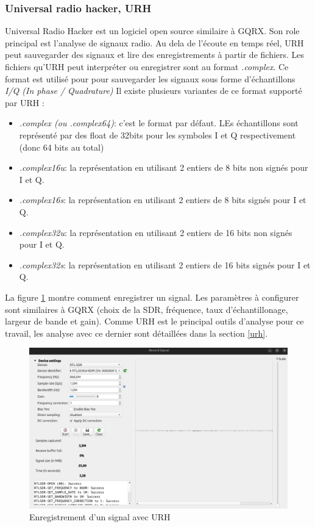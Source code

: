 \subsubsection{Universal radio hacker, URH}

Universal Radio Hacker est un logiciel open source similaire à GQRX. Son role principal est l'analyse de signaux radio. Au dela de l'écoute en temps réel, URH peut sauvegarder des signaux et lire des enregistrements à partir de fichiers. Les fichiers qu'URH peut interpréter ou enregistrer sont au format \textit{.complex}.  Ce format est utilisé pour pour sauvegarder les signaux sous forme d'échantillons \textit{I/Q (In phase / Quadrature)} Il existe plusieurs variantes de ce format supporté par URH :

\begin{itemize}
\item \textit{.complex (ou .complex64)}: c'est le format par défaut. LEs échantillons sont représenté par des float de 32bits pour les symboles I et Q respectivement (donc 64 bits au total)
 
\item  \textit{.complex16u}: la représentation en utilisant 2  entiers de 8 bits non signés pour I et Q.

\item  \textit{.complex16s}: la représentation en utilisant 2  entiers de 8 bits signés pour I et Q.

\item  \textit{.complex32u}: la représentation en utilisant 2  entiers de 16 bits non signés pour I et Q. 

\item  \textit{.complex32s}: la représentation en utilisant 2 entiers de 16 bits signés pour I et Q.
\end{itemize}

La figure \ref{term39} montre comment enregistrer un signal. Les paramètres à configurer sont similaires à GQRX (choix de la SDR, fréquence, taux d'échantillonage, largeur de bande et gain). Comme URH est le principal outils d'analyse pour ce travail, les analyse avec ce dernier sont détaillées dans la section \ref{urh}.

\begin{figure}[h]
\centering

\includegraphics[scale=0.2]{images/urh1.png}
\caption{Enregistrement d'un signal avec URH}\label{term39}
\end{figure}


